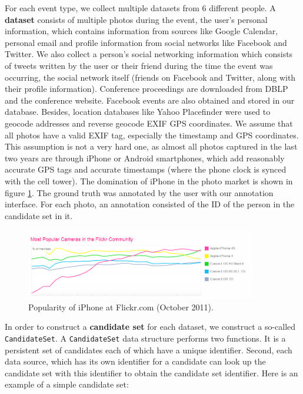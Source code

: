 For each event type, we collect multiple datasets from 6 different people. A \textbf{dataset} consists of multiple photos during the event, the user's personal information, which contains information from sources like Google Calendar, personal email and profile information from social networks like Facebook and Twitter. We also collect a person's social networking information which consists of tweets written by the user or their friend during the time the event was occurring, the social network itself (friends on Facebook and Twitter, along with their profile information). Conference proceedings are downloaded from DBLP and the conference website. Facebook events are also obtained and stored in our database. Besides, location databases like Yahoo Placefinder were used to geocode addresses and reverse geocode EXIF GPS coordinates. We assume that all photos have a valid EXIF tag, especially the timestamp and GPS coordinates. This assumption is not a very hard one, as almost all photos captured in the last two years are through iPhone or Android smartphones, which add reasonably accurate GPS tags and accurate timestamps (where the phone clock is synced with the cell tower). The domination of iPhone in the photo market is shown in figure \ref{fig:flickr-camera-popularity}. The ground truth was annotated by the user with our annotation interface. For each photo, an annotation consisted of the ID of the person in the candidate set in it. 

\begin{figure}[t]
\centering
\includegraphics[width=0.9\textwidth]{media/flickr-camera-popularity.png}
\caption{Popularity of iPhone at Flickr.com (October 2011).}
\label{fig:flickr-camera-popularity}
\end{figure}

In order to construct a \textbf{candidate set} for each dataset, we construct a so-called \texttt{CandidateSet}. A \texttt{CandidateSet} data structure performs two functions. It is a persistent set of candidates each of which have a unique identifier. Second, each data source, which has its own identifier for a candidate can look up the candidate set with this identifier to obtain the candidate set identifier. Here is an example of a simple candidate set:

